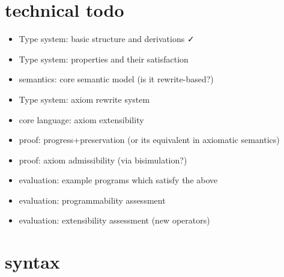 \documentclass{article}
\begin{document}

\section{technical todo}

\begin{itemize}
\item Type system: basic structure and derivations ✓
\item Type system: properties and their satisfaction
\item semantics: core semantic model (is it rewrite-based?)
\item Type system: axiom rewrite system
\item core language: axiom extensibility
\item proof: progress+preservation (or its equivalent in axiomatic semantics)
\item proof: axiom admissibility (via bisimulation?)
\item evaluation: example programs which satisfy the above
\item evaluation: programmability assessment
\item evaluation: extensibility assessment (new operators)
\end{itemize}

\section{syntax}

\newcommand{\closedprogram}{\textit{closed-program}\xspace}
\newcommand{\compiledcomponent}{\textit{compiled-component}\xspace}
\newcommand{\incast}{\textit{incast}\xspace}
\newcommand{\outcast}{\textit{outcast}\xspace}
\newcommand{\seqstart}{\textit{seq-start}\xspace}
\newcommand{\seqend}{\textit{seq-end}\xspace}
\newcommand{\chain}{\textit{chain}\xspace}
\newcommand{\op}{\textit{op}\xspace}
\newcommand{\opt}{τ_{\textit{op}}\xspace}
\newcommand{\N}{ℕ}
\newcommand{\fresh}{\textit{fresh}\xspace}
\newcommand{\inputs}{\textit{inputs}\xspace}
\newcommand{\outputs}{\textit{outputs}\xspace}
\newcommand{\outarity}{\textit{output-arity}\xspace}
\newcommand{\IT}[1]{{\textit{#1}}\xspace}
\end{document}
